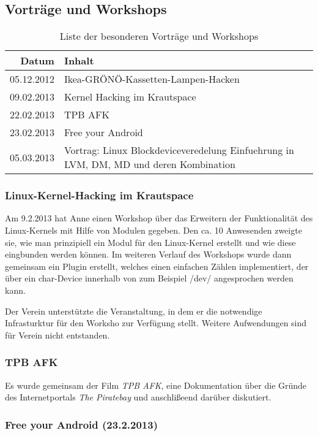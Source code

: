 \documentclass[10pt,DIV16]{scrartcl}
\begin{document}
\subsection{Vorträge und Workshops}

\begin{table}[h]
\begin{tabular}{r|l}
	\textbf{Datum} & \textbf{Inhalt} \\ \hline{}
	05.12.2012 & Ikea-GRÖNÖ-Kassetten-Lampen-Hacken\\
	09.02.2013 & Kernel Hacking im Krautspace\\
	22.02.2013 & TPB AFK\\
	23.02.2013 & Free your Android\\
	05.03.2013 & Vortrag: Linux Blockdeviceveredelung Einfuehrung in LVM, DM, MD und deren Kombination\\
	\end{tabular}
	\caption{Liste der besonderen Vorträge und Workshops}
\end{table}

\subsubsection{Linux-Kernel-Hacking im Krautspace}

Am 9.2.2013 hat Anne einen Workshop über das Erweitern der
Funktionalität des Linux-Kernels mit Hilfe von Modulen gegeben. Den
ca. 10 Anwesenden zweigte sie, wie man prinzipiell ein Modul für den
Linux-Kernel erstellt und wie diese eingbunden werden können. Im
weiteren Verlauf des Workshops wurde dann gemeinsam ein Plugin
erstellt, welches einen einfachen Zählen implementiert, der über ein
char-Device innerhalb von zum Beispiel /dev/ angesprochen werden
kann.

Der Verein unterstützte die Veranstaltung, in dem er die notwendige
Infrasturktur für den Worksho zur Verfügung stellt. Weitere
Aufwendungen sind für Verein nicht entstanden.

\subsubsection{TPB AFK}

Es wurde gemeinsam der Film \textit{TPB AFK}, eine Dokumentation
über die Gründe des Internetportals \textit {The Piratebay} und
anschlißeend darüber diskutiert.

\subsubsection{Free your Android (23.2.2013)}
\end{document}
